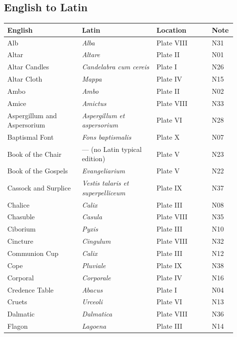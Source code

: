 \subsection*{English to Latin}
{\footnotesize\begin{longtable}{>{\raggedright\arraybackslash}p{0.31\linewidth}>{\raggedright\arraybackslash}p{0.31\linewidth}>{\raggedright\arraybackslash}p{0.23\linewidth}>{\raggedright\arraybackslash}p{0.08\linewidth}}
\toprule
\textbf{English} & \textbf{Latin} & \textbf{Location} & \textbf{Note} \\
\midrule
\endhead
Alb & \textit{Alba} & Plate VIII & N31 \\
Altar & \textit{Altare} & Plate II & N01 \\
Altar Candles & \textit{Candelabra cum cereis} & Plate I & N26 \\
Altar Cloth & \textit{Mappa} & Plate IV & N15 \\
Ambo & \textit{Ambo} & Plate II & N02 \\
Amice & \textit{Amictus} & Plate VIII & N33 \\
Aspergillum and Aspersorium & \textit{Aspergillum et aspersorium} & Plate VI & N28 \\
Baptismal Font & \textit{Fons baptismalis} & Plate X & N07 \\
Book of the Chair & --- (no Latin typical edition) & Plate V & N23 \\
Book of the Gospels & \textit{Evangeliarium} & Plate V & N22 \\
Cassock and Surplice & \textit{Vestis talaris et superpelliceum} & Plate IX & N37 \\
Chalice & \textit{Calix} & Plate III & N08 \\
Chasuble & \textit{Casula} & Plate VIII & N35 \\
Ciborium & \textit{Pyxis} & Plate III & N10 \\
Cincture & \textit{Cingulum} & Plate VIII & N32 \\
Communion Cup & \textit{Calix} & Plate III & N12 \\
Cope & \textit{Pluviale} & Plate IX & N38 \\
Corporal & \textit{Corporale} & Plate IV & N16 \\
Credence Table & \textit{Abacus} & Plate I & N04 \\
Cruets & \textit{Urceoli} & Plate VI & N13 \\
Dalmatic & \textit{Dalmatica} & Plate VIII & N36 \\
Flagon & \textit{Lagoena} & Plate III & N14 \\

\end{longtable}}
